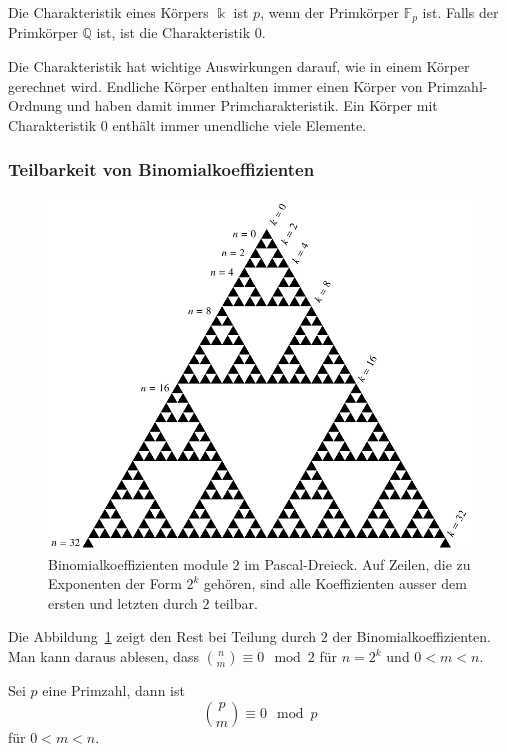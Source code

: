\begin{definition}
Die Charakteristik eines Körpers $\Bbbk$ ist $p$, wenn der Primkörper
$\mathbb{F}_p$ ist.
Falls der Primkörper $\mathbb{Q}$ ist, ist die Charakteristik $0$.
\end{definition}

Die Charakteristik hat wichtige Auswirkungen darauf, wie in einem Körper
gerechnet wird.
Endliche Körper enthalten immer einen Körper von Primzahl-Ordnung und
haben damit immer Primcharakteristik.
Ein Körper mit Charakteristik $0$ enthält immer unendliche viele
Elemente.

\subsubsection{Teilbarkeit von Binomialkoeffizienten}
\begin{figure}
\centering
\includegraphics{chapters/30-endlichekoerper/images/binomial2.pdf}
\caption{Binomialkoeffizienten module $2$ im Pascal-Dreieck.
Auf Zeilen, die zu Exponenten der Form $2^k$ gehören, sind alle 
Koeffizienten ausser dem ersten und letzten durch $2$ teilbar.
\label{buch:endliche-koerper:fig:binomial2}}
\end{figure}
Die Abbildung~\ref{buch:endliche-koerper:fig:binomial2} zeigt den
Rest bei Teilung durch $2$ der Binomialkoeffizienten.
Man kann daraus ablesen, dass $\binom{n}{m}\equiv 0\mod 2$ für $n=2^k$ 
und $0<m<n$.

\begin{satz}
\label{buch:endliche-koerper:satz:binom}
Sei $p$ eine Primzahl, dann ist
\[
\binom{p}{m} \equiv 0\mod p
\]
für $0<m<n$.
\end{satz}

